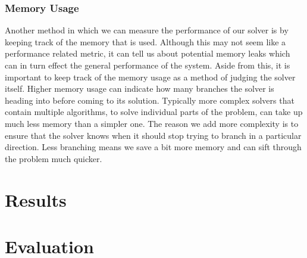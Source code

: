 \documentclass{article}
\begin{document}
\subsubsection{Memory Usage}
Another method in which we can measure the performance of our solver is by keeping track of the
memory that is used. Although this may not seem like a performance related metric, it can tell us
about potential memory leaks which can in turn effect the general performance of the system. Aside
from this, it is important to keep track of the memory usage as a method of judging the solver
itself. Higher memory usage can indicate how many branches the solver is heading into before coming
to its solution. Typically more complex solvers that contain multiple algorithms, to solve
individual parts of the problem, can take up much less memory than a simpler one. The reason we add
more complexity is to ensure that the solver knows when it should stop trying to branch in a
particular direction. Less branching means we save a bit more memory and can sift through the
problem much quicker.


\section{Results}

\section{Evaluation}
\end{document}
